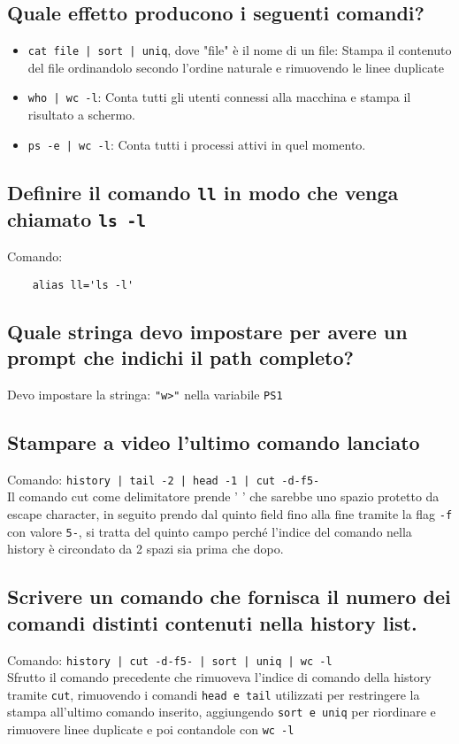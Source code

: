 \documentclass{article}
\begin{document}
\subsection{Quale effetto producono i seguenti comandi? }
\begin{itemize}
    \item \texttt{cat file | sort | uniq}, dove "file" è il nome di un file: Stampa il contenuto del file ordinandolo secondo l'ordine naturale
    e rimuovendo le linee duplicate
    \item \texttt{who | wc -l}: Conta tutti gli utenti connessi alla macchina e stampa il risultato a schermo.
    \item \texttt{ps -e | wc -l}: Conta tutti i processi attivi in quel momento.
\end{itemize}

\subsection{Definire il comando \texttt{ll} in modo che venga chiamato \texttt{ls -l}}
Comando:
\begin{verbatim}
    alias ll='ls -l'
\end{verbatim}

\subsection{Quale stringa devo impostare per avere un prompt che indichi il path completo?}
Devo impostare la stringa: \texttt{"w>"} nella variabile \texttt{PS1}

\subsection{Stampare a video l'ultimo comando lanciato}
Comando: \texttt{history | tail -2 | head -1 | cut -d\space -f5-}\\
Il comando cut come delimitatore prende ' ' che sarebbe uno spazio protetto da escape character,
in seguito prendo dal quinto field fino alla fine tramite la flag \texttt{-f} con valore \texttt{5-}, 
si tratta del quinto campo perché l'indice del comando nella history è circondato da 2 spazi sia prima che dopo.

\subsection{Scrivere un comando che fornisca il numero dei comandi distinti contenuti nella history list.}
Comando: \texttt{history | cut -d\space -f5- | sort | uniq | wc -l}\\
Sfrutto il comando precedente che rimuoveva l'indice di comando della history tramite \texttt{cut}, rimuovendo i comandi \texttt{head e tail}
utilizzati per restringere la stampa all'ultimo comando inserito, aggiungendo \texttt{sort e uniq} per riordinare e rimuovere linee duplicate e 
poi contandole con \texttt{wc -l}
\end{document}
